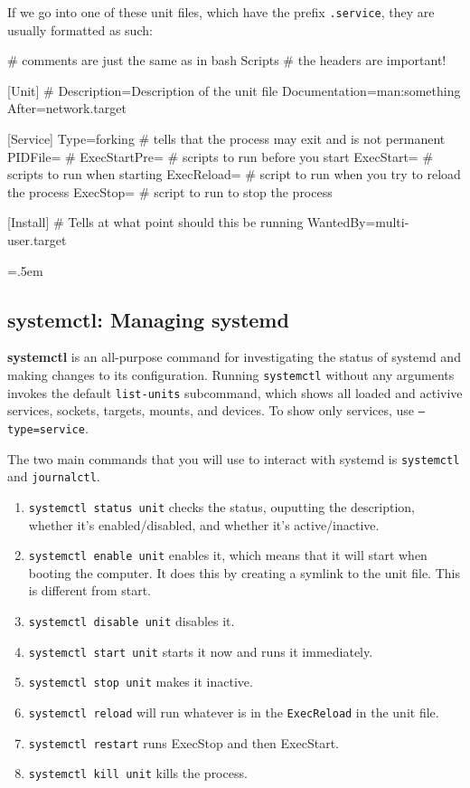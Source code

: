 \documentclass{article}
\newenvironment{cverbatim}
    {\SaveVerbatim{cverb}}
    {\endSaveVerbatim
    \flushleft\fboxrule=0pt\fboxsep=.5em
    \colorbox{cverbbg}{%
      \makebox[\dimexpr\linewidth-2\fboxsep][l]{\BUseVerbatim{cverb}}%
    }
    \endflushleft
  }
\begin{document}
  \begin{example}
    If we go into one of these unit files, which have the prefix \texttt{.service}, they are usually formatted as such: 

    \begin{cverbatim}
      # comments are just the same as in bash Scripts
      # the headers are important! 

      [Unit]        #  
      Description=Description of the unit file 
      Documentation=man:something 
      After=network.target

      [Service]
      Type=forking  # tells that the process may exit and is not permanent
      PIDFile=      # 
      ExecStartPre= # scripts to run before you start 
      ExecStart=    # scripts to run when starting 
      ExecReload=   # script to run when you try to reload the process
      ExecStop=     # script to run to stop the process 

      [Install]   # Tells at what point should this be running
      WantedBy=multi-user.target 

    \end{cverbatim} 
  \end{example}
  
  \subsection{systemctl: Managing systemd} 

    \textbf{systemctl} is an all-purpose command for investigating the status of systemd and making changes to its configuration. Running \texttt{systemctl} without any arguments invokes the default \texttt{list-units} subcommand, which shows all loaded and activive services, sockets, targets, mounts, and devices. To show only services, use \texttt{--type=service}. 

    The two main commands that you will use to interact with systemd is \texttt{systemctl} and \texttt{journalctl}. 
    
    \begin{enumerate}
      \item \texttt{systemctl status unit} checks the status, ouputting the description, whether it's enabled/disabled, and whether it's active/inactive. 
      \item \texttt{systemctl enable unit} enables it, which means that it will start when booting the computer. It does this by creating a symlink to the unit file. This is different from start. 
      \item \texttt{systemctl disable unit} disables it. 
      \item \texttt{systemctl start unit} starts it now and runs it immediately. 
      \item \texttt{systemctl stop unit} makes it inactive. 
      \item \texttt{systemctl reload} will run whatever is in the \texttt{ExecReload} in the unit file. 
      \item \texttt{systemctl restart} runs ExecStop and then ExecStart. 
      \item \texttt{systemctl kill unit} kills the process. 
    \end{enumerate}
\end{document}
